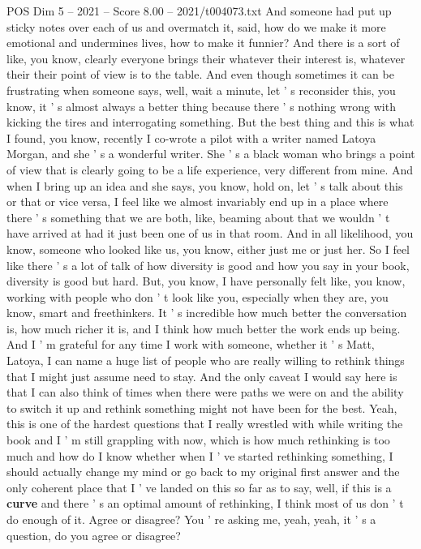 \begin{textsample}{POS Dim 5 – 2021 – Score 8.00 – 2021/t004073.txt}
And someone had put up sticky notes over each of us and overmatch it, said, how do we make it more emotional and undermines lives, how to make it funnier?
And there is a sort of like, you know, clearly everyone brings their whatever their interest is, whatever their their point of view is to the table.
And even though sometimes it can be frustrating when someone says, well, wait a minute, let ' s reconsider this, you know, it ' s almost always a better thing because there ' s nothing wrong with kicking the tires and interrogating something.
But the best thing and this is what I found, you know, recently I co-wrote a pilot with a writer named Latoya Morgan, and she ' s a wonderful writer.
She ' s a black woman who brings a point of view that is clearly going to be a life experience, very different from mine.
And when I bring up an idea and she says, you know, hold on, let ' s talk about this or that or vice versa, I feel like we almost invariably end up in a place where there ' s something that we are both, like, beaming about that we wouldn ' t have arrived at had it just been one of us in that room.
And in all likelihood, you know, someone who looked like us, you know, either just me or just her.
So I feel like there ' s a lot of talk of how diversity is good and how you say in your book, diversity is good but hard.
But, you know, I have personally felt like, you know, working with people who don ' t look like you, especially when they are, you know, smart and freethinkers.
It ' s incredible how much better the conversation is, how much richer it is, and I think how much better the work ends up being.
And I ' m grateful for any time I work with someone, whether it ' s Matt, Latoya, I can name a huge list of people who are really willing to rethink things that I might just assume need to stay.
And the only caveat I would say here is that I can also think of times when there were paths we were on and the ability to switch it up and rethink something might not have been for the best.
Yeah, this is one of the hardest questions that I really wrestled with while writing the book and I ' m still grappling with now, which is how much rethinking is too much and how do I know whether when I ' ve started rethinking something, I should actually change my mind or go back to my original first answer and the only coherent place that I ' ve landed on this so far as to say, well, if this is a \textbf{curve} and there ' s an optimal amount of rethinking, I think most of us don ' t do enough of it.
Agree or disagree?
You ' re asking me, yeah, yeah, it ' s a question, do you agree or disagree?

\end{textsample}
